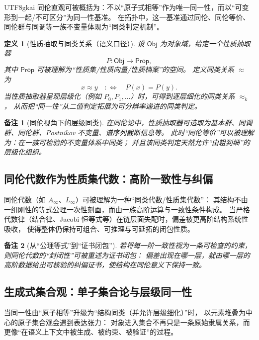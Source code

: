 \documentclass[12pt]{article}
\newtheorem{definition}{定义}[section]
\newtheorem{remark}{备注}[section]
\begin{document}
\begin{CJK*}{UTF8}{gkai}
同伦直观可被概括为：不以“原子式相等”作为唯一同一性，而以“可变形到一起/不可区分”为同一性基准。
在拓扑中，这一基准通过同伦、同伦等价、同伦群与同调等一族不变量体现为“同类判定机制”。

\begin{definition}[性质抽取与同类关系（语义口径）]
设 $\mathsf{Obj}$ 为对象域，给定一个性质抽取器
\[
  P:\mathsf{Obj}\to \mathsf{Prop},
\]
其中 $\mathsf{Prop}$ 可被理解为“性质集/性质向量/性质档案”的空间。
定义同类关系 $\approx$ 为
\[
  x\approx y \quad:\Longleftrightarrow\quad P(x)=P(y).
\]
当性质抽取器呈现层级化（例如 $P_0,P_1,\dots$）时，可得到逐层细化的同类关系 $\approx_k$，
从而把“同一性”从二值判定拓展为可分辨率递进的同类判定。
\end{definition}

\begin{remark}[同伦视角下的层级同类]
在同伦论中，性质抽取器可选取为基本群、同调群、同伦群、Postnikov 不变量、谱序列截断信息等。
此时“同伦等价”可以被理解为：在一族可检验的不变量体系中同类；
并且该同类判定天然允许“由粗到细”的层级化组织。
\end{remark}

\subsection{同伦代数作为性质集代数：高阶一致性与纠偏}
\label{subsec:tex19-homotopy-algebra-as-property-algebra}

同伦代数（如 $A_\infty$、$L_\infty$）\cite{Stasheff1963,LadaStasheff1993,LadaMarkl1995}可被理解为一种“同类代数/性质集代数”：
其结构不由一组刚性的等式公理一次性刻画，而由一族高阶运算与一致性条件构成。
当严格代数律（结合律、Jacobi 恒等式等）在链层面失配时，偏差被更高阶结构系统性吸收，
使得整体仍保持可组合、可推理与可延拓的闭包性质。

\begin{remark}[从“公理等式”到“证书闭包”]
若将每一阶一致性视为一条可检查的约束，则同伦代数的“封闭性”可被重述为证书闭包：
偏差出现在哪一层，就由哪一层的高阶数据给出可核验的纠偏证书，使结构在同伦意义下保持一致。\cite{EdgeOperatorTowerTex17}
\end{remark}

\subsection{生成式集合观：单子集合论与层级同一性}
\label{subsec:tex19-monadic-set-theory}

当同一性由“原子相等”升级为“结构同类（并允许层级细化）”时，
以元素堆叠为中心的原子集合观会遇到表达张力：
对象进入集合不再只是一条原始隶属关系，而更像“在语义上下文中被生成、被约束、被验证”的过程。


\end{CJK*}
\end{document}
